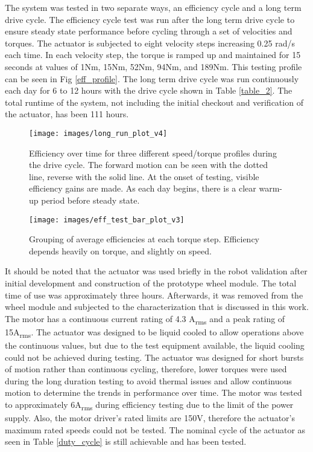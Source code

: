 The system was tested in two separate ways, an efficiency cycle and a long term drive cycle.
The efficiency cycle test was run after the long term drive cycle to ensure steady state performance before cycling through a set of velocities and torques.
The actuator is subjected to eight velocity steps increasing 0.25 rad/s each time.
In each velocity step, the torque is ramped up and maintained for 15 seconds at values of 1Nm, 15Nm, 52Nm, 94Nm, and 189Nm.
This testing profile can be seen in Fig \ref{eff_profile}.
The long term drive cycle was run continuously each day for 6 to 12 hours with the drive cycle shown in Table \ref{table_2}.
The total runtime of the system, not including the initial checkout and verification of the actuator, has been 111 hours.


\begin{figure*}[!t]
	\centering
	\texttt{[image: images/long\_run\_plot\_v4]}
	\caption{Efficiency over time for three different speed/torque profiles during the drive cycle.
		The forward motion can be seen with the dotted line, reverse with the solid line.
		At the onset of testing, visible efficiency gains are made.
		As each day begins, there is a clear warm-up period before steady state.
	}
	\label{long_run}
\end{figure*}


\begin{figure*}[t]
	\centering
	\texttt{[image: images/eff\_test\_bar\_plot\_v3]}
	\caption{Grouping of average efficiencies at each torque step.
		Efficiency depends heavily on torque, and slightly on speed.}
	\label{eff_results}
\end{figure*}

It should be noted that the actuator was used briefly in the robot validation after initial development and construction of the prototype wheel module.
The total time of use was approximately three hours.
Afterwards, it was removed from the wheel module and subjected to the characterization that is discussed in this work.
The motor has a continuous current rating of 4.3 A\textsubscript{rms} and a peak rating of 15A\textsubscript{rms}.
The actuator was designed to be liquid cooled to allow operations above the continuous values, but due to the test equipment available, the liquid cooling could not be achieved during testing.
The actuator was designed for short bursts of motion rather than continuous cycling, therefore, lower torques were used during the long duration testing to avoid thermal issues and allow continuous motion to determine the trends in performance over time.
The motor was tested to approximately 6A\textsubscript{rms} during efficiency testing due to the limit of the power supply.
Also, the motor driver's rated limits are 150V, therefore the actuator's maximum rated speeds could not be tested.
The nominal cycle of the actuator as seen in Table \ref{duty_cycle} is still achievable and has been tested.


